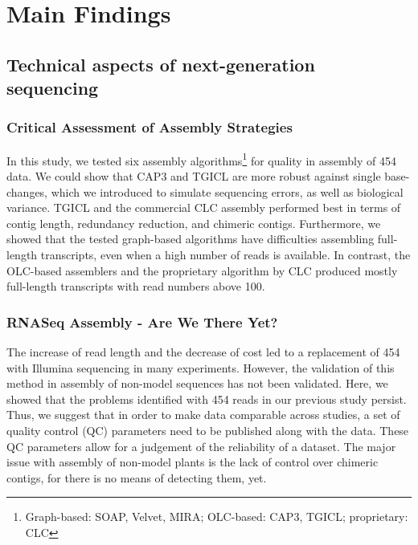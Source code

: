 \chapter{Main Findings} %

\section{Technical aspects of next-generation sequencing}
\subsection{Critical Assessment of Assembly Strategies
\cite{mp_Braeutigam2011}}

In this study, we tested six assembly algorithms\footnote{Graph-based: SOAP, Velvet, MIRA; OLC-based: CAP3, TGICL; proprietary: CLC} for quality in  assembly of 454 data. We could show that CAP3 and TGICL are more robust against single base-changes, which we introduced to simulate sequencing errors, as well as biological variance. TGICL and the commercial CLC  assembly performed best in terms of contig length, redundancy reduction, and chimeric contigs.
Furthermore, we showed that the tested graph-based algorithms have difficulties assembling full-length transcripts, even when a high number of reads is available. In contrast, the OLC-based assemblers and the proprietary algorithm by CLC produced mostly full-length transcripts with read numbers above 100.

\subsection{RNASeq Assembly - Are We There Yet?
\cite{mp_Schliesky2012}}

The increase of read length and the decrease of cost led to a replacement of 454 with Illumina sequencing in many experiments. However, the validation of this method in  assembly of non-model sequences has not been validated. Here, we showed that the problems identified with 454 reads in our previous study \cite{mp_Braeutigam2011} persist. Thus, we suggest that in order to make data comparable across studies, a set of quality control (QC) parameters need to be published along with the data. These QC parameters allow for a judgement of the reliability of a dataset.
The major issue with  assembly of non-model plants is the lack of control over chimeric contigs, for there is no means of detecting them, yet.

